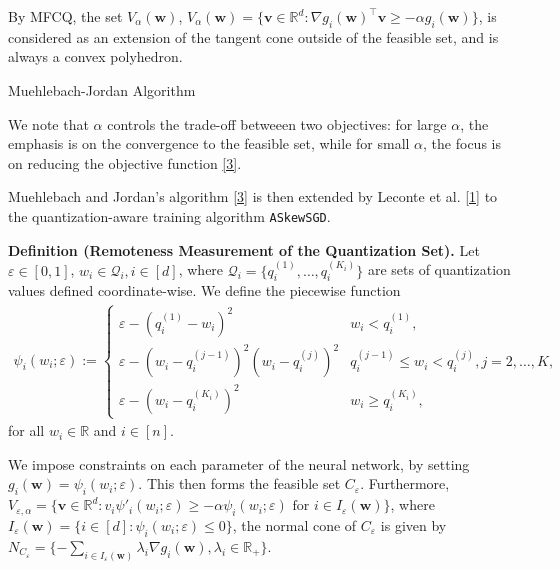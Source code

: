 \documentclass[10pt,a4paper]{article}
\begin{document}
By MFCQ, the set $V_\alpha(\mathbf{w})$, $V_\alpha(\mathbf{w})=\{\mathbf{v}\in\mathbb{R}^d: \nabla g_i(\mathbf{w})^\top \mathbf{v}\geq -\alpha g_i(\mathbf{w})\}$, is considered as an extension of the tangent cone outside of the feasible set, and is always a convex polyhedron.

\begin{algorithm}[H]
  \caption{Muehlebach-Jordan Algorithm}
\end{algorithm}


We note that $\alpha$ controls the trade-off betweeen two objectives: for large $\alpha$, the emphasis is on the convergence to the feasible set,
while for small $\alpha$, the focus is on reducing the objective function \ref{3}.

Muehlebach and Jordan's algorithm \ref{3} is then extended by Leconte et al. \ref{1} to the quantization-aware training algorithm \texttt{ASkewSGD}.

\textbf{Definition (Remoteness Measurement of the Quantization Set).} Let $\varepsilon\in[0,1]$, $w_i\in \mathcal{Q}_i, i\in [d]$,
where $\mathcal{Q}_i=\{q^{(1)}_i, \ldots, q^{(K_i)}_i\}$ are sets of quantization values defined coordinate-wise. We define the piecewise function
\begin{align*}\psi_{i}(w_i;\varepsilon):=\begin{cases}\varepsilon-(q_i^{(1)}-w_i)^2                    & w_i < q_i^{(1)},                                \\
             \varepsilon-(w_i-q_i^{(j-1)})^2(w_i-q_i^{(j)})^2 & q_i^{(j-1)}\leq w_i < q_i^{(j)}, j=2,\ldots, K, \\
             \varepsilon-(w_i-q_i^{(K_i)})^2                  & w_i \geq q_i^{(K_i)},\end{cases}
\end{align*} for all $w_i\in\mathbb{R}$ and $i\in [n]$.

We impose constraints on each parameter of the neural network, by setting $g_i(\mathbf{w})=\psi_i(w_i;\varepsilon)$. This then forms the feasible
set $C_\varepsilon$. Furthermore, $V_{\varepsilon, \alpha}=\{\mathbf{v}\in\mathbb{R}^d: v_i \psi'_i (w_i;\varepsilon)\geq -\alpha \psi_i(w_i;\varepsilon) \text{ for } i\in I_\varepsilon(\mathbf{w})\}$, where $I_\varepsilon(\mathbf{w})=\{i\in[d]: \psi_i(w_i;\varepsilon)\leq 0\}$, the normal cone of $C_\varepsilon$ is given by $N_{C_\varepsilon}=\{-\sum_{i\in I_\varepsilon(\mathbf{w})} \lambda_i\nabla g_i(\mathbf{w}), \lambda_i\in \mathbb{R}_+ \}$.
\end{document}
